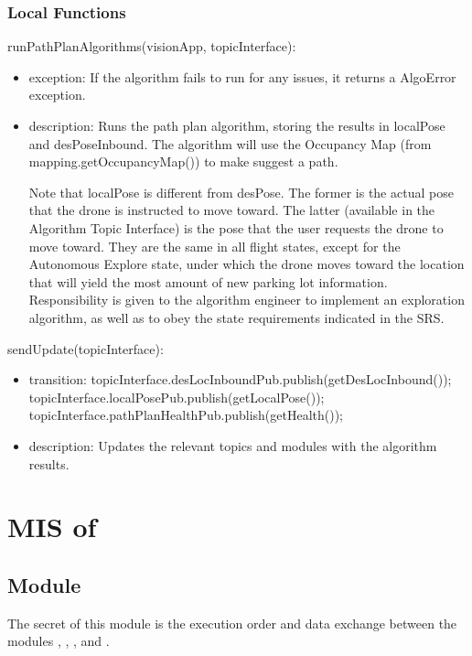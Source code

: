 \documentclass[12pt, titlepage]{article}
\begin{document}
\subsubsection{Local Functions}
\noindent runPathPlanAlgorithms(visionApp, topicInterface):
\begin{itemize}
\item exception: If the algorithm fails to run for any issues, it returns a AlgoError exception. 
\item description: Runs the path plan algorithm, storing the results in localPose and desPoseInbound. The algorithm will use the Occupancy Map (from mapping.getOccupancyMap()) to make suggest a path. 

Note that localPose is different from desPose. The former is the actual pose that the drone is instructed to move toward. The latter (available in the Algorithm Topic Interface) is the pose that the  user requests the drone to move toward. They are the same in all flight states, except for the Autonomous Explore state, under which the drone moves toward the location that will yield the most amount of new parking lot information. Responsibility is given to the algorithm engineer to implement an exploration algorithm, as well as to obey the state requirements indicated in the SRS.
\end{itemize}
\noindent sendUpdate(topicInterface):
\begin{itemize}
\item transition: topicInterface.desLocInboundPub.publish(getDesLocInbound()); \\
topicInterface.localPosePub.publish(getLocalPose()); \\
topicInterface.pathPlanHealthPub.publish(getHealth()); \\
\item description: Updates the relevant topics and modules with the algorithm results.
\end{itemize}
\newpage





\section{MIS of } \label{MIS_ALGORITHM_APP} 
\subsection{Module}
The secret of this module is the execution order and data exchange between the modules , , , and . 
\end{document}

